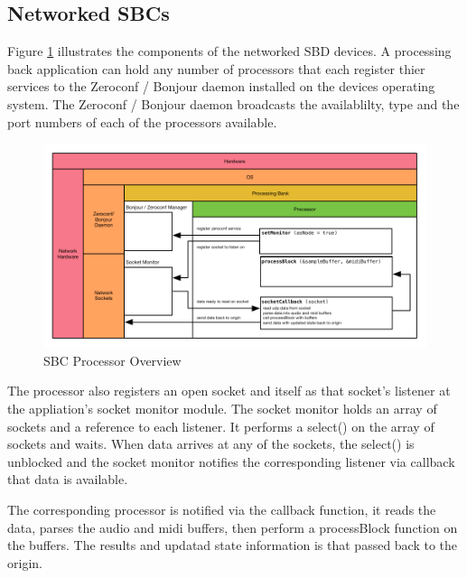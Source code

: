 \subsection{Networked SBCs}

Figure \ref{fig:arch_03} illustrates the components of the networked SBD devices. A processing back application can hold any number of processors that each register thier services to the Zeroconf / Bonjour daemon installed on the devices operating system. The Zeroconf / Bonjour daemon broadcasts the availablilty, type and the port numbers of each of the processors available.

\begin{figure}[H]
    \centering
    \includegraphics[width=\textwidth]{assets/architecture_03.pdf}
    \caption{SBC Processor Overview}
    \label{fig:arch_03}
\end{figure}



The processor also registers an open socket and itself as that socket's listener at the appliation's socket monitor module. The socket monitor holds an array of sockets and a reference to each listener. It performs a select() on the array of sockets and waits. When data arrives at any of the sockets, the select() is unblocked and the socket monitor notifies the corresponding listener via callback that data is available.

The corresponding processor is notified via the callback function, it reads the data, parses the audio and midi buffers, then perform a processBlock function on the buffers. The results and updatad state information is that passed back to the origin.

